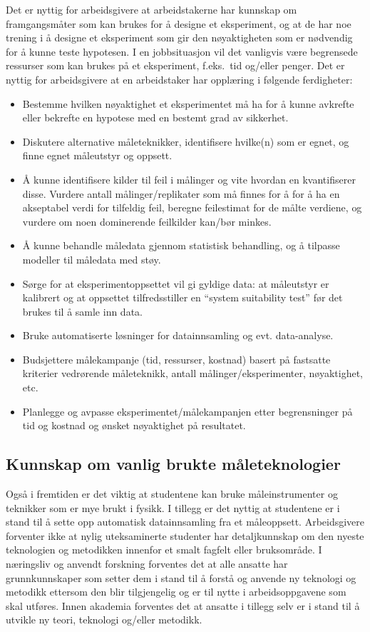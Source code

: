 \documentclass{article}
\begin{document}
Det er nyttig for arbeidsgivere at arbeidstakerne har kunnskap om framgangsmåter som kan brukes for å designe et eksperiment, og at de har noe trening i å designe et eksperiment som gir den nøyaktigheten som er nødvendig for å kunne teste hypotesen. I en jobbsituasjon vil det vanligvis være begrensede ressurser som kan brukes på et eksperiment, f.eks.~tid og/eller penger.
Det er nyttig for arbeidsgivere at en arbeidstaker har opplæring i følgende ferdigheter:
\begin{itemize}
  \item Bestemme hvilken nøyaktighet et eksperimentet må ha for å kunne avkrefte eller bekrefte en hypotese med en bestemt grad av sikkerhet.
  \item Diskutere alternative måleteknikker, identifisere hvilke(n) som er egnet, og finne egnet måleutstyr og oppsett.
  \item Å kunne identifisere kilder til feil i målinger og vite hvordan en kvantifiserer disse. Vurdere antall målinger/replikater som må finnes for å for å ha en akseptabel verdi for tilfeldig feil, beregne feilestimat for de målte verdiene, og vurdere om noen dominerende feilkilder kan/bør minkes.
  \item Å kunne behandle måledata gjennom statistisk behandling, og å tilpasse modeller til måledata med støy.
  \item Sørge for at eksperimentoppsettet vil gi gyldige data: at måleutstyr er kalibrert og at oppsettet tilfredsstiller en ``system suitability test'' før det brukes til å samle inn data.
  \item Bruke automatiserte løsninger for datainnsamling og evt. data-analyse.
  \item Budsjettere målekampanje (tid, ressurser, kostnad) basert på fastsatte kriterier vedrørende måleteknikk, antall målinger/eksperimenter, nøyaktighet, etc.
  \item Planlegge og avpasse eksperimentet/målekampanjen etter begrensninger på tid og kostnad og ønsket nøyaktighet på resultatet.
\end{itemize}

\subsection{Kunnskap om vanlig brukte måleteknologier}
Også i fremtiden er det viktig at studentene kan bruke måleinstrumenter og teknikker som er mye brukt i fysikk. I tillegg er det nyttig at studentene er i stand til å sette opp automatisk datainnsamling fra et måleoppsett.
Arbeidsgivere forventer ikke at nylig uteksaminerte studenter har detaljkunnskap om den nyeste teknologien og metodikken innenfor et smalt fagfelt eller bruksområde.
I næringsliv og anvendt forskning forventes det at alle ansatte har grunnkunnskaper som setter dem i stand til å forstå og anvende ny teknologi og metodikk ettersom den blir tilgjengelig og er til nytte i arbeidsoppgavene som skal utføres.
Innen akademia forventes det at ansatte i tillegg selv er i stand til å utvikle ny teori, teknologi og/eller metodikk.
\end{document}
